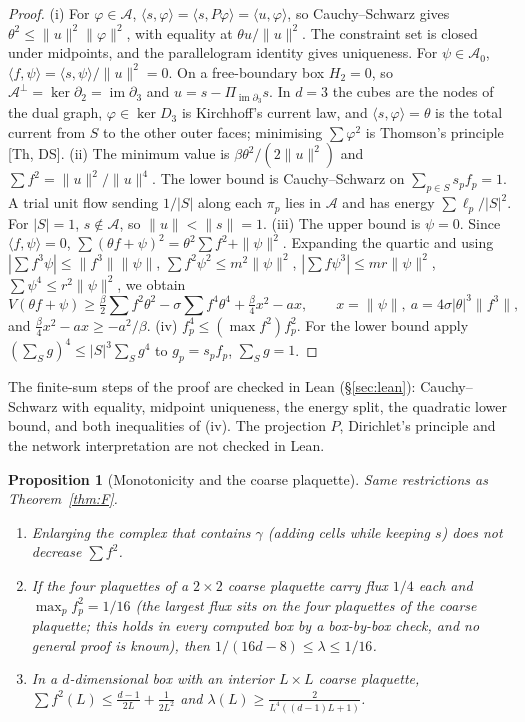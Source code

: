 \documentclass[11pt,a4paper]{article}
\newtheorem{proposition}[theorem]{Proposition}
\theoremstyle{definition}
\theoremstyle{remark}
\newcommand{\cA}{\mathcal{A}}
\newcommand{\im}{\operatorname{im}}
\begin{document}
\begin{proof}
(i) For $\varphi\in\cA$, $\langle s,\varphi\rangle=\langle s,P\varphi\rangle=\langle u,\varphi\rangle$, so Cauchy--Schwarz gives $\theta^2\le\|u\|^2\|\varphi\|^2$, with equality at $\theta u/\|u\|^2$. The constraint set is closed under midpoints, and the parallelogram identity gives uniqueness. For $\psi\in\cA_0$, $\langle f,\psi\rangle=\langle s,\psi\rangle/\|u\|^2=0$. On a free-boundary box $H_2=0$, so $\cA^\perp=\ker\partial_2=\im\partial_3$ and $u=s-\Pi_{\im\partial_3}s$. In $d=3$ the cubes are the nodes of the dual graph, $\varphi\in\ker D_3$ is Kirchhoff's current law, and $\langle s,\varphi\rangle=\theta$ is the total current from $S$ to the other outer faces; minimising $\sum\varphi^2$ is Thomson's principle [Th, DS].
(ii) The minimum value is $\beta\theta^2/(2\|u\|^2)$ and $\sum f^2=\|u\|^2/\|u\|^4$. The lower bound is Cauchy--Schwarz on $\sum_{p\in S}s_pf_p=1$. A trial unit flow sending $1/|S|$ along each $\pi_p$ lies in $\cA$ and has energy $\sum\ell_p/|S|^2$. For $|S|=1$, $s\notin\cA$, so $\|u\|<\|s\|=1$.
(iii) The upper bound is $\psi=0$. Since $\langle f,\psi\rangle=0$, $\sum(\theta f+\psi)^2=\theta^2\sum f^2+\|\psi\|^2$. Expanding the quartic and using $|\sum f^3\psi|\le\|f^3\|\|\psi\|$, $\sum f^2\psi^2\le m^2\|\psi\|^2$, $|\sum f\psi^3|\le mr\|\psi\|^2$, $\sum\psi^4\le r^2\|\psi\|^2$, we obtain
\[V(\theta f+\psi)\ge\tfrac\beta2{\textstyle\sum} f^2\theta^2-\sigma{\textstyle\sum} f^4\theta^4+\tfrac\beta4x^2-ax,\qquad x=\|\psi\|,\ a=4\sigma|\theta|^3\|f^3\|,\]
and $\frac\beta4x^2-ax\ge-a^2/\beta$.
(iv) $f_p^4\le(\max f^2)f_p^2$. For the lower bound apply $(\sum_Sg)^4\le|S|^3\sum_Sg^4$ to $g_p=s_pf_p$, $\sum_Sg=1$.
\end{proof}

The finite-sum steps of the proof are checked in Lean (\S\ref{sec:lean}): Cauchy--Schwarz with equality, midpoint uniqueness, the energy split, the quadratic lower bound, and both inequalities of (iv).
The projection $P$, Dirichlet's principle and the network interpretation are not checked in Lean.

\begin{proposition}[Monotonicity and the coarse plaquette]\label{prop:ineq}
Same restrictions as Theorem~\ref{thm:F}.
\begin{enumerate}[label=(\alph*)]
\item Enlarging the complex that contains $\gamma$ (adding cells while keeping $s$) does not decrease $\sum f^2$.
\item If the four plaquettes of a $2\times2$ coarse plaquette carry flux $1/4$ each and $\max_pf_p^2=1/16$ (the largest flux sits on the four plaquettes of the coarse plaquette; this holds in every computed box by a box-by-box check, and no general proof is known), then $1/(16d-8)\le\lambda\le1/16$.
\item In a $d$-dimensional box with an interior $L\times L$ coarse plaquette, $\sum f^2(L)\le\frac{d-1}{2L}+\frac{1}{2L^2}$ and $\lambda(L)\ge\frac{2}{L^4((d-1)L+1)}$.
\end{enumerate}
\end{proposition}
\end{document}
